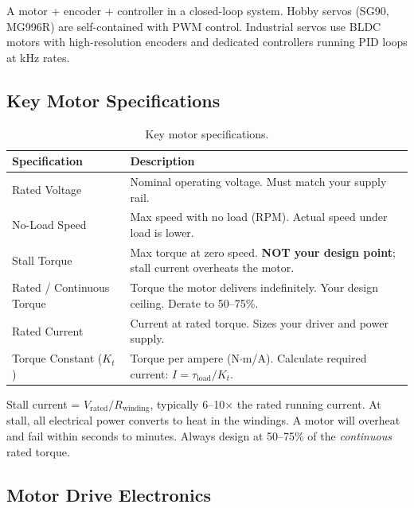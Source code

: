 A motor + encoder + controller in a closed-loop system. Hobby servos (SG90, MG996R) are self-contained with PWM control. Industrial servos use BLDC motors with high-resolution encoders and dedicated controllers running PID loops at kHz rates.



\subsection{Key Motor Specifications}

\begin{table}[htbp]
\centering\small
\begin{tabularx}{\textwidth}{l X}
  \toprule
  \textbf{Specification} & \textbf{Description} \\
  \midrule
  Rated Voltage & Nominal operating voltage. Must match your supply rail. \\
  No-Load Speed & Max speed with no load (RPM). Actual speed under load is lower. \\
  Stall Torque & Max torque at zero speed. \textbf{NOT your design point}; stall current overheats the motor. \\
  Rated / Continuous Torque & Torque the motor delivers indefinitely. Your design ceiling. Derate to 50--75\%. \\
  Rated Current & Current at rated torque. Sizes your driver and power supply. \\
  Torque Constant ($K_t$) & Torque per ampere (N$\cdot$m/A). Calculate required current: $I = \tau_{\text{load}} / K_t$. \\
  \bottomrule
\end{tabularx}
\caption{Key motor specifications.}
\end{table}

\begin{warningbox}
Stall current = $V_{\text{rated}} / R_{\text{winding}}$, typically 6--10$\times$ the rated running current. At stall, all electrical power converts to heat in the windings. A motor will overheat and fail within seconds to minutes. Always design at 50--75\% of the \emph{continuous} rated torque.
\end{warningbox}

\subsection{Motor Drive Electronics}
\label{sec:motor_drivers}

